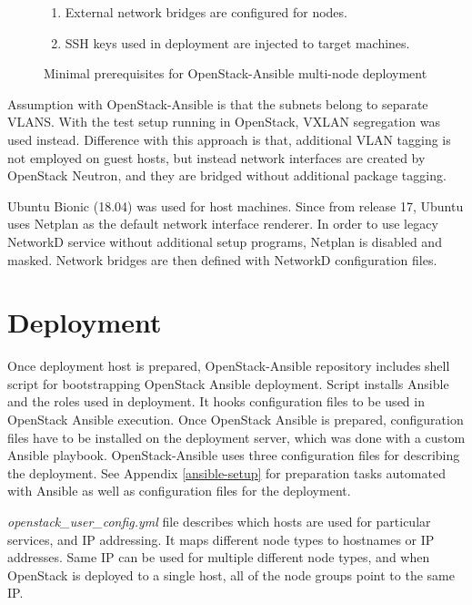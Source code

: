 \begin{figure}[!b]
\centering
\begin{enumerate}
  \itemsep0em
  \item External network bridges are configured for nodes.
  \item SSH keys used in deployment are injected to target machines.
\end{enumerate}
\caption{Minimal prerequisites for OpenStack-Ansible multi-node deployment}
\label{fig:osa-requirements}
\end{figure}

Assumption with OpenStack-Ansible is that the subnets belong to separate VLANS.
With the test setup running in OpenStack, VXLAN segregation was used instead.
Difference with this approach is that, additional VLAN tagging is not employed
on guest hosts, but instead network interfaces are created by OpenStack
Neutron, and they are bridged without additional package tagging.

Ubuntu Bionic (18.04) was used for host machines. Since from release 17, Ubuntu
uses Netplan \cite{netplan} as the default network interface renderer. In order
to use legacy NetworkD service without additional setup programs, Netplan is
disabled and masked. Network bridges are then defined with NetworkD
configuration files.

\section{Deployment}

Once deployment host is prepared, OpenStack-Ansible repository includes shell
script for bootstrapping OpenStack Ansible deployment. Script installs Ansible
and the roles used in deployment. It hooks configuration files to be used in
OpenStack Ansible execution. Once OpenStack Ansible is prepared, configuration
files have to be installed on the deployment server, which was done with a
custom Ansible playbook. OpenStack-Ansible uses three configuration files for
describing the deployment. See Appendix \ref{ansible-setup} for preparation
tasks automated with Ansible as well as configuration files for the deployment.

\textit{openstack\_user\_config.yml} file describes which hosts are used for
particular services, and IP addressing. It maps different node types to
hostnames or IP addresses. Same IP can be used for multiple different node
types, and when OpenStack is deployed to a single host, all of the node groups
point to the same IP.

